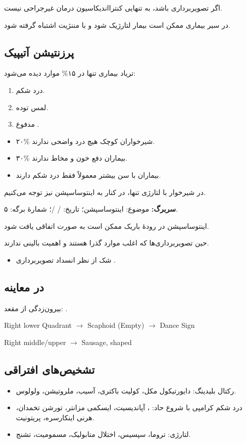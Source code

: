 \documentclass[12pt,a4paper]{article}
\begin{document}
اگر تصویربرداری  باشد، به تنهایی کنترااندیکاسیون درمان غیرجراحی نیست.

در سیر بیماری ممکن است بیمار لتارژیک شود و با مننژیت اشتباه گرفته شود.

\subsection*{پرزنتیشن آتیپیک}
تریاد بیماری تنها در ۱۵\% موارد دیده می‌شود:
\begin{enumerate}
\item درد شکم.
\item لمس توده.
\item مدفوع .
\end{enumerate}
\begin{itemize}
\item ۲۰\% شیرخواران کوچک هیچ درد واضحی ندارند.
\item ۳۰\% بیماران دفع خون و مخاط ندارند.
\item بیماران با سن بیشتر معمولاً فقط درد شکم دارند.
\end{itemize}
در شیرخوار با لتارژی تنها، در کنار  به اینتوساسپشن نیز توجه می‌کنیم.

\textbf{سربرگ:} موضوع: اینتوساسپشن؛ تاریخ: / /؛ شمارهٔ برگه: ۵.

اینتوساسپشن در رودهٔ باریک ممکن است به صورت اتفاقی یافت شود.

حین تصویربرداری‌ها که اغلب موارد گذرا هستند و اهمیت بالینی ندارند.
\begin{itemize}
\item شک از نظر انسداد \IntussusceptionArrow تصویربرداری .
\end{itemize}
\subsection*{در معاینه}
بیرون‌زدگی از مقعد: .
\begin{latin}
Right lower Quadrant \(\longrightarrow\) Scaphoid (Empty) \(\longrightarrow\) Dance Sign

Right middle/upper \(\longrightarrow\) Sausage, shaped
\end{latin}

\subsection*{تشخیص‌های افتراقی}
\begin{itemize}
\item رکتال بلیدینگ: دایورتیکول مکل، کولیت باکتری، آسیب، ملروتیشن، ولولوس.
\item درد شکم کرامپی با شروع حاد: ، آپاندیسیت، ایسکمی مزانتر، تورشن تخمدان، هرنی اینکارسره، پریتونیت.
\item لتارژی: تروما، سپسیس، اختلال متابولیک، مسمومیت، تشنج.
\end{itemize}
\end{document}
